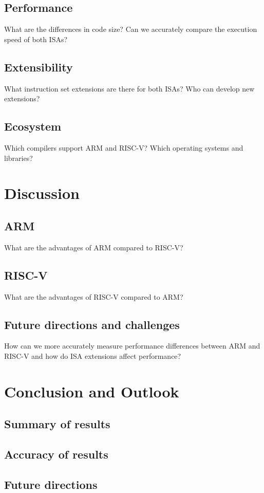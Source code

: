 \documentclass[conference]{IEEEtran}
\begin{document}
	\subsection{Performance}
	What are the differences in code size? Can we accurately compare the execution speed of both ISAs?
	\subsection{Extensibility}
	What instruction set extensions are there for both ISAs? Who can develop new extensions?
	\subsection{Ecosystem}
	Which compilers support ARM and RISC-V? Which operating systems and libraries?


\section{Discussion}
\label{ref:discussion}
	\subsection{ARM}
	What are the advantages of ARM compared to RISC-V?
	\subsection{RISC-V}
	What are the advantages of RISC-V compared to ARM?
	\subsection{Future directions and challenges}
	How can we more accurately measure performance differences between ARM and RISC-V and how do ISA extensions affect performance?

\section{Conclusion and Outlook}
\label{ref:conclusion}
	\subsection{Summary of results}
	\subsection{Accuracy of results}
	\subsection{Future directions}
\end{document}
